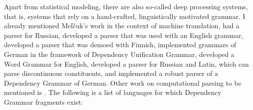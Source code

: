 Apart from statistical modeling, there are also so-called deep processing systems, that is, systems
that rely on a hand-crafted, linguistically motivated grammar. I already mentioned Meľčuk's work in
the context of machine translation, \citet{HZ60a-u} had a parser for Russian,
\citet{SN86a} developed a parser that was used with an English
grammar, \citet*{JLV86a-u} developed a parser that was demoed with Finnish, \citet{Hellwig86a-u,Hellwig2003a,Hellwig2006a}
implemented grammars of German in the framework of Dependency Unification Grammar, \citet{Hudson89a}
developed a Word Grammar for English,
\citet{Covington90a} developed a parser for Russian and Latin, which can parse discontinuous constituents, and
\citet{Menzel98a-u} implemented a robust parser of a Dependency Grammar of German.
Other work on computational parsing to be mentioned is
.
The following is a list of languages for which Dependency Grammar
fragments exist:
